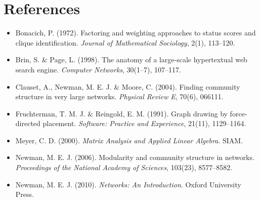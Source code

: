 \documentclass[11pt]{article}
\begin{document}
\section*{References}

\begin{itemize}[leftmargin=2em,itemsep=0.2em]
\item Bonacich, P. (1972). Factoring and weighting approaches to status scores and clique identification. \emph{Journal of Mathematical Sociology}, 2(1), 113--120.
\item Brin, S. \& Page, L. (1998). The anatomy of a large-scale hypertextual web search engine. \emph{Computer Networks}, 30(1--7), 107--117.
\item Clauset, A., Newman, M. E. J. \& Moore, C. (2004). Finding community structure in very large networks. \emph{Physical Review E}, 70(6), 066111.
\item Fruchterman, T. M. J. \& Reingold, E. M. (1991). Graph drawing by force-directed placement. \emph{Software: Practice and Experience}, 21(11), 1129--1164.
\item Meyer, C. D. (2000). \emph{Matrix Analysis and Applied Linear Algebra}. SIAM.
\item Newman, M. E. J. (2006). Modularity and community structure in networks. \emph{Proceedings of the National Academy of Sciences}, 103(23), 8577--8582.
\item Newman, M. E. J. (2010). \emph{Networks: An Introduction}. Oxford University Press.
\end{itemize}
\end{document}
